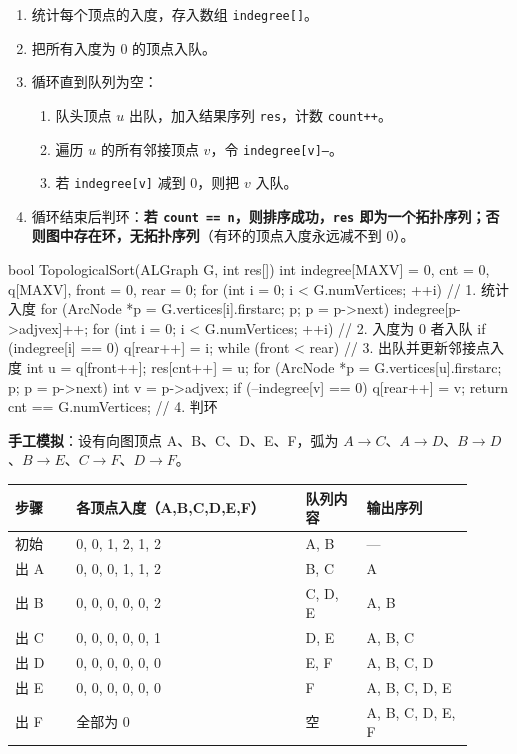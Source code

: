 \documentclass[11pt,openany,UTF8]{ctexbook}
\begin{document}
\begin{enumerate}
\item 统计每个顶点的入度，存入数组 \texttt{indegree[]\allowbreak{}}。
\item 把所有入度为 0 的顶点入队。
\item 循环直到队列为空：
\begin{enumerate}
\item 队头顶点 $u$ 出队，加入结果序列 \texttt{res}，计数 \texttt{count+\allowbreak{}+\allowbreak{}}。
\item 遍历 $u$ 的所有邻接顶点 $v$，令 \texttt{indegree[v]\allowbreak{}--}。
\item 若 \texttt{indegree[v]\allowbreak{}} 减到 0，则把 $v$ 入队。
\end{enumerate}
\item 循环结束后判环：\textbf{若 \texttt{count =\allowbreak{}=\allowbreak{} n}，则排序成功，\texttt{res} 即为一个拓扑序列；否则图中存在环，无拓扑序列}（有环的顶点入度永远减不到 0）。
\end{enumerate}
\begin{codebox}
bool TopologicalSort(ALGraph G, int res[]) {
    int indegree[MAXV] = {0}, cnt = 0, q[MAXV], front = 0, rear = 0;
    for (int i = 0; i < G.numVertices; ++i)          // 1. 统计入度
        for (ArcNode *p = G.vertices[i].firstarc; p; p = p->next)
            indegree[p->adjvex]++;
    for (int i = 0; i < G.numVertices; ++i)          // 2. 入度为 0 者入队
        if (indegree[i] == 0) q[rear++] = i;
    while (front < rear) {                            // 3. 出队并更新邻接点入度
        int u = q[front++];
        res[cnt++] = u;
        for (ArcNode *p = G.vertices[u].firstarc; p; p = p->next) {
            int v = p->adjvex;
            if (--indegree[v] == 0) q[rear++] = v;
        }
    }
    return cnt == G.numVertices;                      // 4. 判环
}
\end{codebox}

\textbf{手工模拟}：设有向图顶点 A、B、C、D、E、F，弧为 $A\to C$、$A\to D$、$B\to D$、$B\to E$、$C\to F$、$D\to F$。

\begingroup\small\setlength{\tabcolsep}{4.0pt}
\begin{longtable}{@{}L{0.1220\linewidth}L{0.4538\linewidth}L{0.1220\linewidth}L{0.2135\linewidth}@{}}
\toprule
\textbf{步骤} & \textbf{各顶点入度（A,B,C,D,E,F）} & \textbf{队列内容} & \textbf{输出序列} \\
\midrule
\endhead
初始 & 0, 0, 1, 2, 1, 2 & A, B & — \\
出 A & 0, 0, 0, 1, 1, 2 & B, C & A \\
出 B & 0, 0, 0, 0, 0, 2 & C, D, E & A, B \\
出 C & 0, 0, 0, 0, 0, 1 & D, E & A, B, C \\
出 D & 0, 0, 0, 0, 0, 0 & E, F & A, B, C, D \\
出 E & 0, 0, 0, 0, 0, 0 & F & A, B, C, D, E \\
出 F & 全部为 0 & 空 & A, B, C, D, E, F \\
\bottomrule
\end{longtable}
\endgroup
\end{document}
